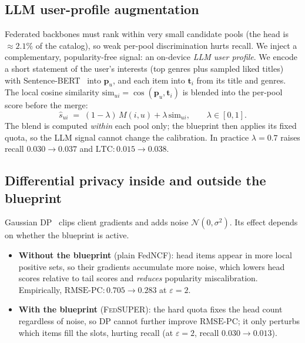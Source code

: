 \documentclass{article}
\newcommand{\Fed}{\textsc{FedSUPER}}
\newcommand{\RMSEPC}{\mathrm{RMSE\text{-}PC}}
\newcommand{\LTC}{\mathrm{LTC}}
\begin{document}
\subsection{LLM user-profile augmentation}

Federated backbones must rank within very small candidate pools (the head is \(\approx 2.1\%\) of
the catalog), so weak per-pool discrimination hurts recall. We inject a complementary,
popularity-free signal: an on-device \emph{LLM user profile}. We encode a short statement of the
user's interests (top genres plus sampled liked titles) with Sentence-BERT~\cite{reimers2019sbert}
into \(\mathbf{p}_u\), and each item into \(\mathbf{t}_i\) from its title and genres. The local
cosine similarity \(\mathrm{sim}_{u i}=\cos(\mathbf{p}_u,\mathbf{t}_i)\) is blended into the
per-pool score before the merge:
\begin{equation}
\label{eq:blend}
\widehat{s}_{u i} \;=\; (1-\lambda)\,M(i,u) + \lambda\,\mathrm{sim}_{u i}, \qquad \lambda\in[0,1].
\end{equation}
The blend is computed \emph{within} each pool only; the blueprint then applies its fixed quota, so
the LLM signal cannot change the calibration. In practice \(\lambda=0.7\) raises recall
\(0.030\to0.037\) and \(\LTC: 0.015\to0.038\).

\subsection{Differential privacy inside and outside the blueprint}

Gaussian DP~\cite{abadi2016dp} clips client gradients and adds noise \(\mathcal{N}(0,\sigma^2)\).
Its effect depends on whether the blueprint is active.
\begin{itemize}
\item \textbf{Without the blueprint} (plain FedNCF): head items appear in more local positive sets,
so their gradients accumulate more noise, which lowers head scores relative to tail scores and
\emph{reduces} popularity miscalibration. Empirically, \(\RMSEPC: 0.705\to0.283\) at
\(\varepsilon=2\).
\item \textbf{With the blueprint} (\Fed{}): the hard quota fixes the head count regardless of
noise, so DP cannot further improve \(\RMSEPC\); it only perturbs which items fill the slots,
hurting recall (at \(\varepsilon=2\), recall \(0.030\to0.013\)).
\end{itemize}
\end{document}
